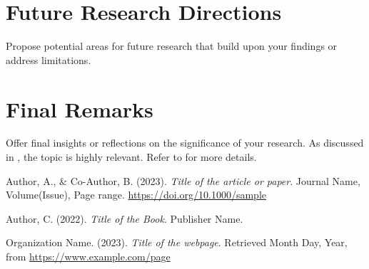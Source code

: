 \documentclass[12pt,a4paper]{report}
\begin{document}
\begin{spacing}{1.5}
    \section{Future Research Directions}
    Propose potential areas for future research that build upon your findings or address limitations.

    \section{Final Remarks}
    Offer final insights or reflections on the significance of your research.
    As discussed in \cite{Sample2023}, the topic is highly relevant. Refer to \cite{Book2022} for more details.


\end{spacing}

{}

% 
\renewcommand{\bibname}{References} %
\begin{thebibliography}{99}
    Author, A., \& Co-Author, B. (2023).
    \textit{Title of the article or paper}.
    Journal Name, Volume(Issue), Page range.
    \href{https://doi.org/10.1000/sample}{https://doi.org/10.1000/sample}

    Author, C. (2022).
    \textit{Title of the Book}.
    Publisher Name.

    Organization Name. (2023).
    \textit{Title of the webpage}.
    Retrieved Month Day, Year, from \url{https://www.example.com/page}
\end{thebibliography}

\appendix  %
\end{document}

